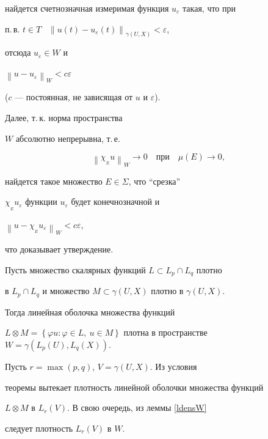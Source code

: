 найдется счетнозначная измеримая функция $u_{\varepsilon}$ такая, что при


п.\,в. $t \in T$ \ ${\left\| {u(t)-u_{\varepsilon}(t)}


\right\|}_{\gamma(U,X)} < \varepsilon$,


отсюда $u_{\varepsilon} \in W$ и


${\left\| {u - u_{\varepsilon}} \right\|}_W < c \varepsilon$


($c$ --- постоянная, не зависящая от $u$ и $\varepsilon$).


Далее, т.\,к. норма пространства


$W$ абсолютно непрерывна, т.\,е.


$$


{\left\| {\chi_{_E} u} \right\| }_W \rightarrow 0


\quad \text{при} \quad \mu(E) \rightarrow 0,


$$


найдется такое множество $E \in \Sigma$, что ``срезка''


${\chi}_{_E} u_\varepsilon $ функции $u_\varepsilon$ будет конечнозначной и


${\left\| {u - {\chi}_{_E}u_{\varepsilon}} \right\|}_W < c \varepsilon$,


что доказывает утверждение.





\begin{thms} \label{dens}


Пусть множество скалярных функций $L \subset L_p \cap L_q$ плотно


в $L_p \cap L_q$ и множество $M \subset \gamma(U,X)$ плотно в $\gamma(U,X)$.


Тогда линейная оболочка множества функций


$L \otimes M = \left\{ {\varphi u: \varphi \in L,


\ u \in M} \right\}$ плотна в пространстве $W=


\gamma(L_p(U), L_q(X))$.


\end{thms}





\begin{pf}


Пусть $r=\max (p,q)$, $V=\gamma(U,X)$. Из условия


теоремы вытекает плотность линейной оболочки множества функций


$L \otimes M$ в $L_r(V)$. В свою очередь, из леммы \ref{ldensW}


следует плотность $L_r(V)$ в $W$.


\end{pf}





